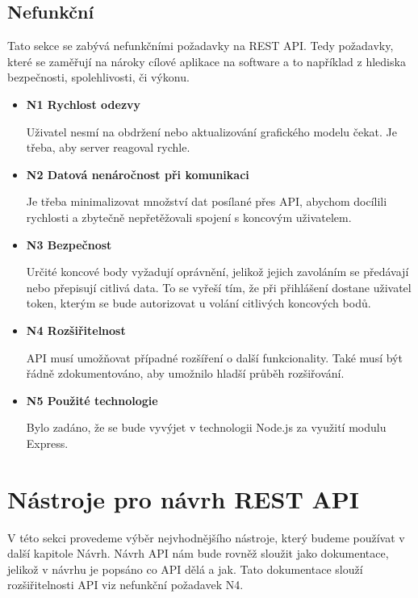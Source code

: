 \documentclass[thesis=B,czech]{FITthesis}[2012/06/26]
\begin{document}
        \subsection{Nefunkční}
            Tato sekce se zabývá nefunkčními požadavky na REST API. Tedy požadavky, které se zaměřují na nároky cílové aplikace na software a to například z hlediska bezpečnosti, spolehlivosti, či výkonu.
            \begin{itemize}
                \item \textbf{N1 Rychlost odezvy}

                    Uživatel nesmí na obdržení nebo aktualizování grafického modelu čekat. Je třeba, aby server reagoval rychle.
                \item \textbf{N2 Datová nenáročnost při komunikaci}

                    Je třeba minimalizovat množství dat posílané přes API, abychom docílili rychlosti a zbytečně nepřetěžovali spojení s koncovým uživatelem.
                \item \textbf{N3 Bezpečnost}
                    
                    Určité koncové body vyžadují oprávnění, jelikož jejich zavoláním se předávají nebo přepisují citlivá data. To se vyřeší tím, že při přihlášení dostane uživatel token, kterým se bude autorizovat u volání citlivých koncových bodů.
                \item \textbf{N4 Rozšiřitelnost}

                    API musí umožňovat případné rozšíření o další funkcionality. Také musí být řádně zdokumentováno, aby umožnilo hladší průběh rozšiřování.
                \item \textbf{N5 Použité technologie}

                    Bylo zadáno, že se bude vyvýjet v technologii Node.js za využití modulu Express.
            \end{itemize}
        \section{Nástroje pro návrh REST API}
        V této sekci provedeme výběr nejvhodnějšího nástroje, který budeme používat v další kapitole Návrh.
        Návrh API nám bude rovněž sloužit jako dokumentace, jelikož v návrhu je popsáno co API dělá a jak. Tato dokumentace slouží rozšiřitelnosti API viz nefunkční požadavek N4.
        
\end{document}
